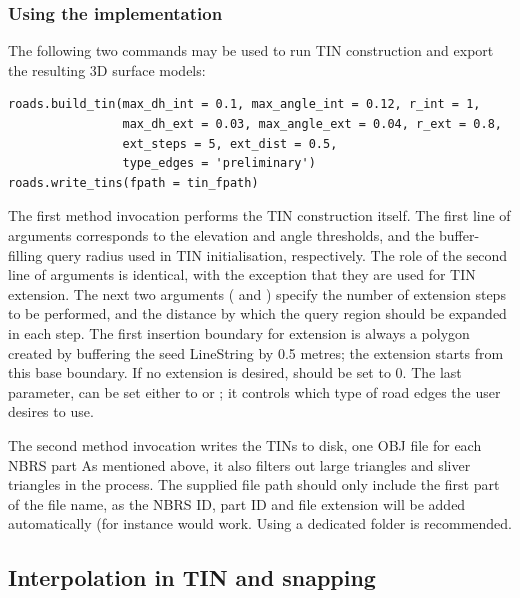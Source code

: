 \subsubsection{Using the implementation}

The following two commands may be used to run TIN construction and export the resulting 3D surface models:

\begin{lstlisting}
roads.build_tin(max_dh_int = 0.1, max_angle_int = 0.12, r_int = 1,
                max_dh_ext = 0.03, max_angle_ext = 0.04, r_ext = 0.8,
                ext_steps = 5, ext_dist = 0.5,
                type_edges = 'preliminary')
roads.write_tins(fpath = tin_fpath)
\end{lstlisting}

The first method invocation performs the TIN construction itself. The first line of arguments corresponds to the elevation and angle thresholds, and the buffer-filling query radius used in TIN initialisation, respectively. The role of the second line of arguments is identical, with the exception that they are used for TIN extension. The next two arguments ( and ) specify the number of extension steps to be performed, and the distance by which the query region should be expanded in each step. The first insertion boundary for extension is always a polygon created by buffering the seed LineString by 0.5 metres; the extension starts from this base boundary. If no extension is desired,  should be set to 0. The last parameter,  can be set either to  or ; it controls which type of road edges the user desires to use.

The second method invocation writes the TINs to disk, one OBJ file for each NBRS part As mentioned above, it also filters out large triangles and sliver triangles in the process. The supplied file path should only include the first part of the file name, as the NBRS ID, part ID and file extension will be added automatically (for instance  would work. Using a dedicated folder is recommended.

\subsection{Interpolation in TIN and snapping}
\label{sub:r_interpolation}


